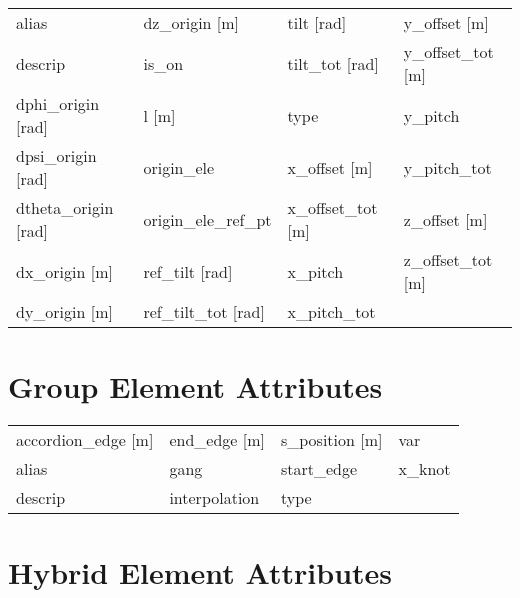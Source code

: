  \begin{tabular}{llll} \toprule
alias                            & dz_origin [m]                    & tilt [rad]                       & y_offset [m]                     \\
descrip                          & is_on                            & tilt_tot [rad]                   & y_offset_tot [m]                 \\
dphi_origin [rad]                & l [m]                            & type                             & y_pitch                          \\
dpsi_origin [rad]                & origin_ele                       & x_offset [m]                     & y_pitch_tot                      \\
dtheta_origin [rad]              & origin_ele_ref_pt                & x_offset_tot [m]                 & z_offset [m]                     \\
dx_origin [m]                    & ref_tilt [rad]                   & x_pitch                          & z_offset_tot [m]                 \\
dy_origin [m]                    & ref_tilt_tot [rad]               & x_pitch_tot                      &                                  \\
 \bottomrule
 \end{tabular}
 \vfill
 
 \section{Group Element Attributes}
 \label{s:list.group}
 
 \begin{tabular}{llll} \toprule
accordion_edge [m]               & end_edge [m]                     & s_position [m]                   & var                              \\
alias                            & gang                             & start_edge                       & x_knot                           \\
descrip                          & interpolation                    & type                             &                                  \\
 \bottomrule
 \end{tabular}
 \vfill
 
 \section{Hybrid Element Attributes}
 \label{s:list.hybrid}
 
